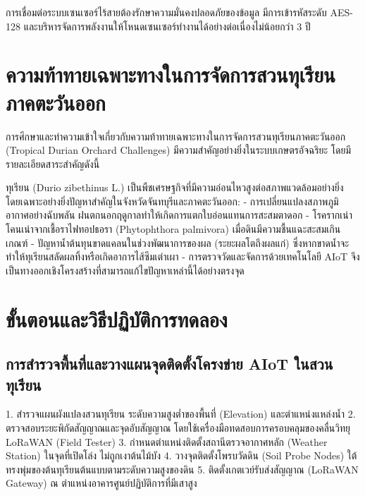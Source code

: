 \begin{techbox}
การเชื่อมต่อระบบเซนเซอร์ไร้สายต้องรักษาความมั่นคงปลอดภัยของข้อมูล มีการเข้ารหัสระดับ AES-128 และบริหารจัดการพลังงานให้โหนดเซนเซอร์ทำงานได้อย่างต่อเนื่องไม่น้อยกว่า 3 ปี
\end{techbox}

\section{ความท้าทายเฉพาะทางในการจัดการสวนทุเรียนภาคตะวันออก}

การศึกษาและทำความเข้าใจเกี่ยวกับความท้าทายเฉพาะทางในการจัดการสวนทุเรียนภาคตะวันออก (Tropical Durian Orchard Challenges) มีความสำคัญอย่างยิ่งในระบบเกษตรอัจฉริยะ โดยมีรายละเอียดสาระสำคัญดังนี้

ทุเรียน (Durio zibethinus L.) เป็นพืชเศรษฐกิจที่มีความอ่อนไหวสูงต่อสภาพแวดล้อมอย่างยิ่ง โดยเฉพาะอย่างยิ่งปัญหาสำคัญในจังหวัดจันทบุรีและภาคตะวันออก:
- การเปลี่ยนแปลงสภาพภูมิอากาศอย่างฉับพลัน ฝนตกนอกฤดูกาลทำให้เกิดการแตกใบอ่อนแทนการสะสมตาดอก
- โรครากเน่าโคนเน่าจากเชื้อราไฟทอปธอรา (Phytophthora palmivora) เมื่อดินมีความชื้นแฉะสะสมเกินเกณฑ์
- ปัญหาน้ำต้นทุนขาดแคลนในช่วงพัฒนาการของผล (ระยะผลโตถึงผลแก่) ซึ่งหากขาดน้ำจะทำให้ทุเรียนสลัดผลทิ้งหรือเกิดอาการไส้ซึมเต่าเผา
- การตรวจวัดและจัดการด้วยเทคโนโลยี AIoT จึงเป็นทางออกเชิงโครงสร้างที่สามารถแก้ไขปัญหาเหล่านี้ได้อย่างตรงจุด

\section{ขั้นตอนและวิธีปฏิบัติการทดลอง}

\subsection{การสำรวจพื้นที่และวางแผนจุดติดตั้งโครงข่าย AIoT ในสวนทุเรียน}
\begin{sensorbox}
1. สำรวจแผนผังแปลงสวนทุเรียน ระดับความสูงต่ำของพื้นที่ (Elevation) และตำแหน่งแหล่งน้ำ
2. ตรวจสอบระยะพิกัดสัญญาณและจุดอับสัญญาณ โดยใช้เครื่องมือทดสอบการครอบคลุมของคลื่นวิทยุ LoRaWAN (Field Tester)
3. กำหนดตำแหน่งติดตั้งสถานีตรวจอากาศหลัก (Weather Station) ในจุดที่เปิดโล่ง ไม่ถูกเงาต้นไม้บัง
4. วางจุดติดตั้งโพรบวัดดิน (Soil Probe Nodes) ใต้ทรงพุ่มของต้นทุเรียนต้นแบบตามระดับความสูงของดิน
5. ติดตั้งเกตเวย์รับส่งสัญญาณ (LoRaWAN Gateway) ณ ตำแหน่งอาคารศูนย์ปฏิบัติการที่มีเสาสูง
\end{sensorbox}

